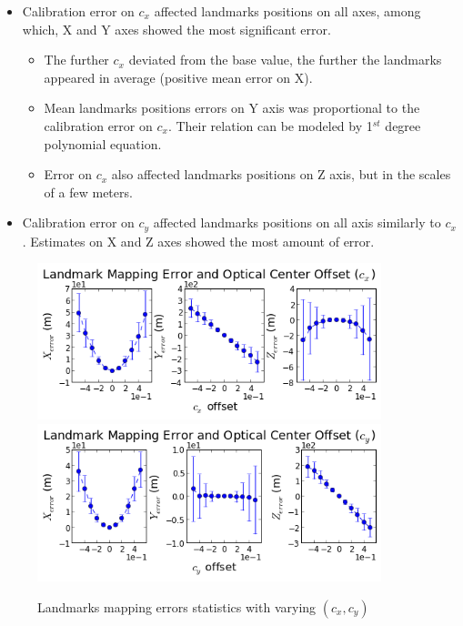 \begin{itemize}
  \item Calibration error on $c_{x}$ affected landmarks positions on all
  axes, among which, X and Y axes showed the most significant error.
  \begin{itemize}
    \item The further $c_{x}$ deviated from the base value, the further
    the landmarks appeared in average (positive mean error on X).
    \item Mean landmarks positions errors on Y axis was proportional to
    the calibration error on $c_x$. Their relation can be modeled by
    1$^{st}$ degree polynomial equation.
    \item Error on $c_{x}$ also affected landmarks positions on Z
    axis, but in the scales of a few meters.
  \end{itemize}
  \item Calibration error on $c_{y}$ affected landmarks positions on
  all axis similarly to $c_{x}$. Estimates on X and Z axes showed the
  most amount of error.
\end{itemize}

\begin{figure}[h] %
  \centering
  \includegraphics[width=10cm, keepaspectratio=true]{./Figures/SimulationFigures/Figure28.png}
  \includegraphics[width=10cm, keepaspectratio=true]{./Figures/SimulationFigures/Figure29.png}
  \caption{Landmarks mapping errors statistics with varying $(c_x, c_y)$}
  \label{fig:simfig28-29}
\end{figure}

